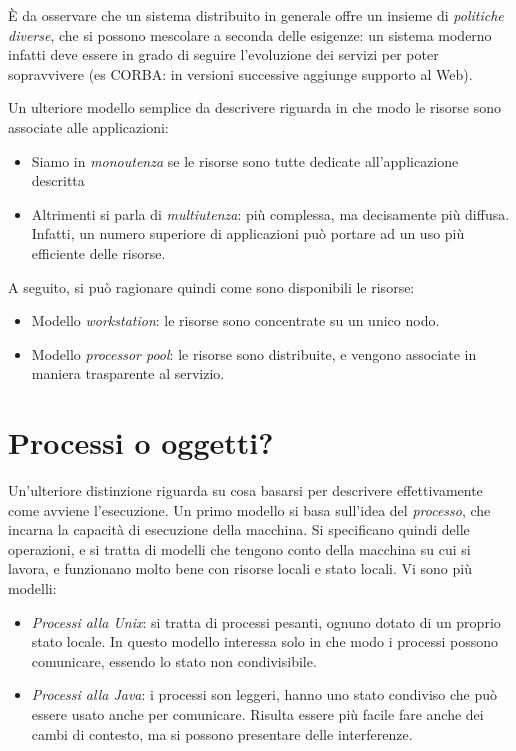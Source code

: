 È da osservare che un sistema distribuito in generale offre un insieme di \textit{politiche diverse}, che si possono
mescolare a seconda delle esigenze: un sistema moderno infatti deve essere in grado di seguire l'evoluzione dei servizi
per poter sopravvivere (es CORBA: in versioni successive aggiunge supporto al Web).

Un ulteriore modello semplice da descrivere riguarda in che modo le risorse
sono associate alle applicazioni:
\begin{itemize}
 \item Siamo in \textit{monoutenza} se le risorse sono tutte dedicate all'applicazione descritta
 \item Altrimenti si parla di \textit{multiutenza}: più complessa, ma decisamente più diffusa. Infatti, un numero
superiore di applicazioni può portare ad un uso più efficiente delle risorse.
\end{itemize}
A seguito, si può ragionare quindi come sono disponibili le risorse:
\begin{itemize}
 \item Modello \textit{workstation}: le risorse sono concentrate su un unico nodo.
 \item Modello \textit{processor pool}: le risorse sono distribuite, e vengono associate in maniera trasparente al
servizio.
\end{itemize}

\section{Processi o oggetti?}
Un'ulteriore distinzione riguarda su cosa basarsi per descrivere effettivamente come avviene l'esecuzione.
Un primo modello si basa sull'idea del \textit{processo}, che incarna la capacità di esecuzione della macchina. Si
specificano quindi delle operazioni, e si tratta di modelli che tengono conto della macchina su cui si lavora, e
funzionano molto
bene con risorse locali e stato locali. Vi sono più modelli:
\begin{itemize}
 \item \textit{Processi alla Unix}: si tratta di processi pesanti, ognuno dotato
di un proprio stato locale. In questo modello
interessa solo in che modo i processi possono comunicare, essendo lo stato non
condivisibile.
 \item \textit{Processi alla Java}: i processi son leggeri, hanno uno stato
condiviso che può essere usato anche per comunicare.
Risulta essere più facile fare anche dei cambi di contesto, ma si possono
presentare delle interferenze.
\end{itemize}

